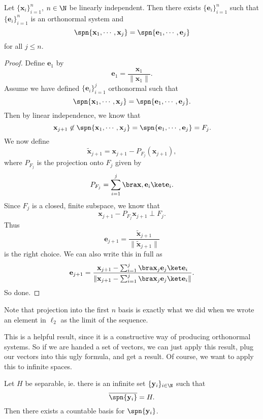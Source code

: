 \documentclass[a4paper]{article}
\begin{document}
\begin{prop}
  Let $\{\mathbf{x}_i\}_{i = 1}^n$, $n \in \N$ be linearly independent. Then there exists $\{\mathbf{e}_i\}_{i = 1}^n$ such that $\{\mathbf{e}_i\}_{i = 1}^n$ is an orthonormal system and
  \[
    \spn\{\mathbf{x}_1, \cdots, \mathbf{x}_j\} = \spn\{\mathbf{e}_1, \cdots, \mathbf{e}_j\}
  \]
  for all $j \leq n$.
\end{prop}

\begin{proof}
  Define $\mathbf{e}_1$ by
  \[
    \mathbf{e}_1 = \frac{\mathbf{x}_1}{\|\mathbf{x}_1\|}.
  \]
  Assume we have defined $\{\mathbf{e}_i\}_{i = 1}^j$ orthonormal such that
  \[
    \spn\{\mathbf{x}_1, \cdots, \mathbf{x}_j\} = \spn\{\mathbf{e}_1, \cdots, \mathbf{e}_j\}.
  \]
  Then by linear independence, we know that
  \[
    \mathbf{x}_{j + 1} \not\in \spn\{\mathbf{x}_1, \cdots, \mathbf{x}_j\} = \spn\{\mathbf{e}_1, \cdots, \mathbf{e}_j\} = F_j.
  \]
  We now define
  \[
    \tilde{\mathbf{x}}_{j + 1} = \mathbf{x}_{j + 1} - P_{F_j}(\mathbf{x}_{j + 1}),
  \]
  where $P_{F_j}$ is the projection onto $F_j$ given by
  \[
    P_{F_j} = \sum_{i = 1}^j \bra \mathbf{x}, \mathbf{e}_i\ket \mathbf{e}_i.
  \]
  Since $F_j$ is a closed, finite subspace, we know that
  \[
    \mathbf{x}_{j + 1} - P_{F_j} \mathbf{x}_{j + 1} \perp F_j.
  \]
  Thus
  \[
    \mathbf{e}_{j + 1} = \frac{\tilde{\mathbf{x}}_{j + 1}}{\|\tilde{\mathbf{x}}_{j + 1}\|}
  \]
  is the right choice. We can also write this in full as
  \[
    \mathbf{e}_{j + 1} = \frac{\mathbf{x}_{j + 1} - \sum_{i = 1}^j \bra \mathbf{x}_j \mathbf{e}_j\ket \mathbf{e}_i}{\|\mathbf{x}_{j + 1} - \sum_{i = 1}^j \bra \mathbf{x}_j \mathbf{e}_j\ket \mathbf{e}_i\|}.
  \]
  So done.
\end{proof}
Note that projection into the first $n$ basis is exactly what we did when we wrote an element in $\ell_2$ as the limit of the sequence.

This is a helpful result, since it is a constructive way of producing orthonormal systems. So if we are handed a set of vectors, we can just apply this result, plug our vectors into this ugly formula, and get a result. Of course, we want to apply this to infinite spaces.

\begin{prop}
  Let $H$ be separable, ie. there is an infinite set $\{\mathbf{y}_i\}_{i \in \N}$ such that
  \[
    \overline{\spn \{\mathbf{y}_i\}} = H.
  \]
  Then there exists a countable basis for $\spn \{\mathbf{y}_i\}$.
\end{prop}
\end{document}
